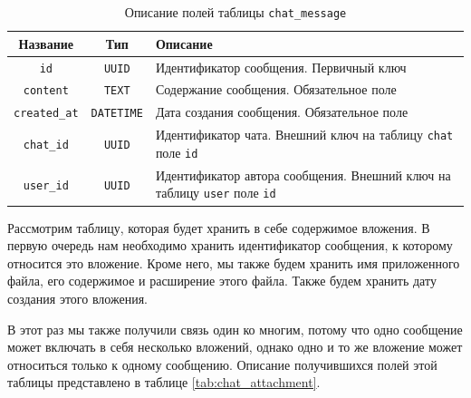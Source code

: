 \documentclass[a4paper,14pt]{extarticle}
\begin{document}
\begin{center}
    \begin{longtable}{|c|c|>{\centering\arraybackslash}m{10.6cm}|}
        \caption{Описание полей таблицы \texttt{chat\_message}}
        \label{tab:chat_message}
        \\
        \hline
        \textbf{Название}    & \textbf{Тип}      & \textbf{Описание}                                                                      \\
        \hline
        \texttt{id}          & \texttt{UUID}     & Идентификатор сообщения. Первичный ключ                                                \\
        \hline
        \texttt{content}     & \texttt{TEXT}     & Содержание сообщения. Обязательное поле                                                \\
        \hline
        \texttt{created\_at} & \texttt{DATETIME} & Дата создания сообщения. Обязательное поле                                             \\
        \hline
        \texttt{chat\_id}    & \texttt{UUID}     & Идентификатор чата. Внешний ключ на таблицу \texttt{chat} поле \texttt{id}             \\
        \hline
        \texttt{user\_id}    & \texttt{UUID}     & Идентификатор автора сообщения. Внешний ключ на таблицу \texttt{user} поле \texttt{id} \\
        \hline
    \end{longtable}
\end{center}

Рассмотрим таблицу, которая будет хранить в себе содержимое вложения. В первую очередь нам необходимо хранить идентификатор сообщения, к которому относится это вложение. Кроме него, мы также будем хранить имя приложенного файла, его содержимое и расширение этого файла. Также будем хранить дату создания этого вложения.

В этот раз мы также получили связь один ко многим, потому что одно сообщение может включать в себя несколько вложений, однако одно и то же вложение может относиться только к одному сообщению. Описание получившихся полей этой таблицы представлено в таблице \ref{tab:chat_attachment}.
\end{document}

